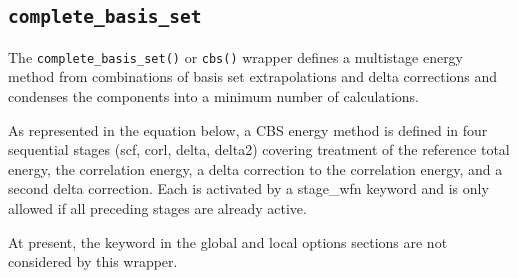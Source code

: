 \subsection{\texttt{complete\_basis\_set}\label{sec:wrapcbs}}

The \texttt{complete\_basis\_set()} or \texttt{cbs()} wrapper defines a
multistage energy method from combinations of basis set extrapolations
and delta corrections and condenses the components into a minimum
number of calculations.

As represented in the equation below, a CBS energy method is defined in
four sequential stages (scf, corl, delta, delta2) covering treatment of
the reference total energy, the correlation energy, a delta
correction to the correlation energy, and a second delta correction.
Each is activated by a stage\_wfn keyword and is only allowed if all
preceding stages are already active.

At present, the  keyword in the global and
local options sections are not considered by this wrapper.


